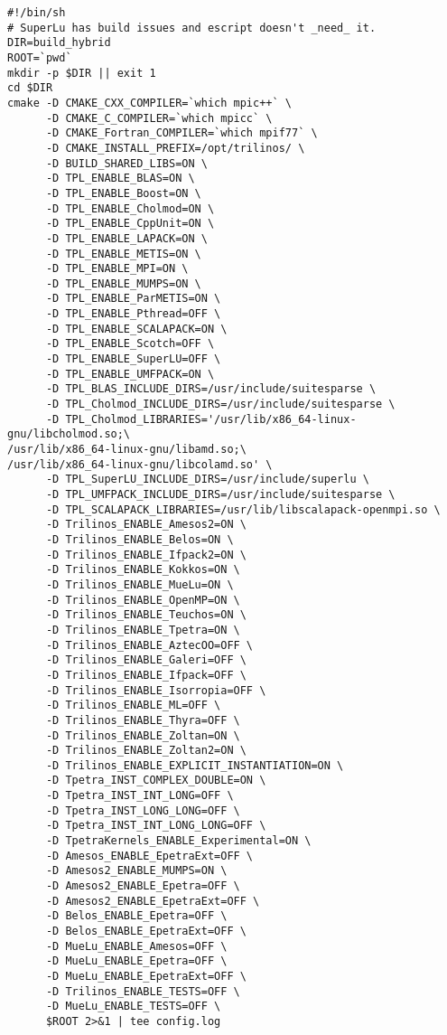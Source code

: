 \begin{verbatim}
#!/bin/sh
# SuperLu has build issues and escript doesn't _need_ it.
DIR=build_hybrid
ROOT=`pwd`
mkdir -p $DIR || exit 1
cd $DIR
cmake -D CMAKE_CXX_COMPILER=`which mpic++` \
      -D CMAKE_C_COMPILER=`which mpicc` \
      -D CMAKE_Fortran_COMPILER=`which mpif77` \
      -D CMAKE_INSTALL_PREFIX=/opt/trilinos/ \
      -D BUILD_SHARED_LIBS=ON \
      -D TPL_ENABLE_BLAS=ON \
      -D TPL_ENABLE_Boost=ON \
      -D TPL_ENABLE_Cholmod=ON \
      -D TPL_ENABLE_CppUnit=ON \
      -D TPL_ENABLE_LAPACK=ON \
      -D TPL_ENABLE_METIS=ON \
      -D TPL_ENABLE_MPI=ON \
      -D TPL_ENABLE_MUMPS=ON \
      -D TPL_ENABLE_ParMETIS=ON \
      -D TPL_ENABLE_Pthread=OFF \
      -D TPL_ENABLE_SCALAPACK=ON \
      -D TPL_ENABLE_Scotch=OFF \
      -D TPL_ENABLE_SuperLU=OFF \
      -D TPL_ENABLE_UMFPACK=ON \
      -D TPL_BLAS_INCLUDE_DIRS=/usr/include/suitesparse \
      -D TPL_Cholmod_INCLUDE_DIRS=/usr/include/suitesparse \
      -D TPL_Cholmod_LIBRARIES='/usr/lib/x86_64-linux-gnu/libcholmod.so;\
/usr/lib/x86_64-linux-gnu/libamd.so;\
/usr/lib/x86_64-linux-gnu/libcolamd.so' \
      -D TPL_SuperLU_INCLUDE_DIRS=/usr/include/superlu \
      -D TPL_UMFPACK_INCLUDE_DIRS=/usr/include/suitesparse \
      -D TPL_SCALAPACK_LIBRARIES=/usr/lib/libscalapack-openmpi.so \
      -D Trilinos_ENABLE_Amesos2=ON \
      -D Trilinos_ENABLE_Belos=ON \
      -D Trilinos_ENABLE_Ifpack2=ON \
      -D Trilinos_ENABLE_Kokkos=ON \
      -D Trilinos_ENABLE_MueLu=ON \
      -D Trilinos_ENABLE_OpenMP=ON \
      -D Trilinos_ENABLE_Teuchos=ON \
      -D Trilinos_ENABLE_Tpetra=ON \
      -D Trilinos_ENABLE_AztecOO=OFF \
      -D Trilinos_ENABLE_Galeri=OFF \
      -D Trilinos_ENABLE_Ifpack=OFF \
      -D Trilinos_ENABLE_Isorropia=OFF \
      -D Trilinos_ENABLE_ML=OFF \
      -D Trilinos_ENABLE_Thyra=OFF \
      -D Trilinos_ENABLE_Zoltan=ON \
      -D Trilinos_ENABLE_Zoltan2=ON \
      -D Trilinos_ENABLE_EXPLICIT_INSTANTIATION=ON \
      -D Tpetra_INST_COMPLEX_DOUBLE=ON \
      -D Tpetra_INST_INT_LONG=OFF \
      -D Tpetra_INST_LONG_LONG=OFF \
      -D Tpetra_INST_INT_LONG_LONG=OFF \
      -D TpetraKernels_ENABLE_Experimental=ON \
      -D Amesos_ENABLE_EpetraExt=OFF \
      -D Amesos2_ENABLE_MUMPS=ON \
      -D Amesos2_ENABLE_Epetra=OFF \
      -D Amesos2_ENABLE_EpetraExt=OFF \
      -D Belos_ENABLE_Epetra=OFF \
      -D Belos_ENABLE_EpetraExt=OFF \
      -D MueLu_ENABLE_Amesos=OFF \
      -D MueLu_ENABLE_Epetra=OFF \
      -D MueLu_ENABLE_EpetraExt=OFF \
      -D Trilinos_ENABLE_TESTS=OFF \
      -D MueLu_ENABLE_TESTS=OFF \
      $ROOT 2>&1 | tee config.log
\end{verbatim}
